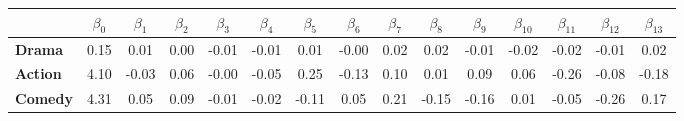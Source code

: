 \begin{tabular}{|l|c|c|c|c|c|c|c|c|c|c|c|c|c|c|}
\hline
&\textbf{$\beta_{0}$}&\textbf{$\beta_{1}$}&\textbf{$\beta_{2}$}&\textbf{$\beta_{3}$}&\textbf{$\beta_{4}$}&\textbf{$\beta_{5}$}&\textbf{$\beta_{6}$}&\textbf{$\beta_{7}$}&\textbf{$\beta_{8}$}&\textbf{$\beta_{9}$}&\textbf{$\beta_{10}$}&\textbf{$\beta_{11}$}&\textbf{$\beta_{12}$}&\textbf{$\beta_{13}$}\\\hline
\textbf{Drama}&0.15&0.01&0.00&-0.01&-0.01&0.01&-0.00&0.02&0.02&-0.01&-0.02&-0.02&-0.01&0.02\\\hline
\textbf{Action}&4.10&-0.03&0.06&-0.00&-0.05&0.25&-0.13&0.10&0.01&0.09&0.06&-0.26&-0.08&-0.18\\\hline
\textbf{Comedy}&4.31&0.05&0.09&-0.01&-0.02&-0.11&0.05&0.21&-0.15&-0.16&0.01&-0.05&-0.26&0.17\\\hline
\end{tabular}
